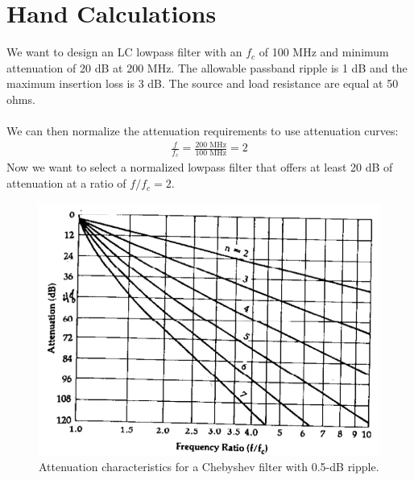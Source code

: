 \documentclass[letterpaper,12pt]{article}
\begin{document}
\newpage
\section{Hand Calculations}
We want to design an LC lowpass filter with an $f_c$ of 100 MHz and minimum attenuation of 20 dB at 200 MHz. The allowable passband ripple is 1 dB and the maximum insertion loss is 3 dB. The source and load resistance are equal at 50 ohms. \\
\\
We can then normalize the attenuation requirements to use attenuation curves:
\begin{align*}
    \frac{f}{f_c} = \frac{200 \text{ MHz}}{100 \text{ MHz}} = 2
\end{align*}
Now we want to select a normalized lowpass filter that offers at least 20 dB of attenuation at a ratio of $f/f_c = 2$.
\begin{figure}[H] 
    \centering \includegraphics[width=0.5\columnwidth]{figures/3.attenuation_characteristics}
    \caption{
            \label{fig:2.attenuation_characteristics}
            Attenuation characteristics for a Chebyshev filter with 0.5-dB ripple.
    }
\end{figure}
\end{document}

